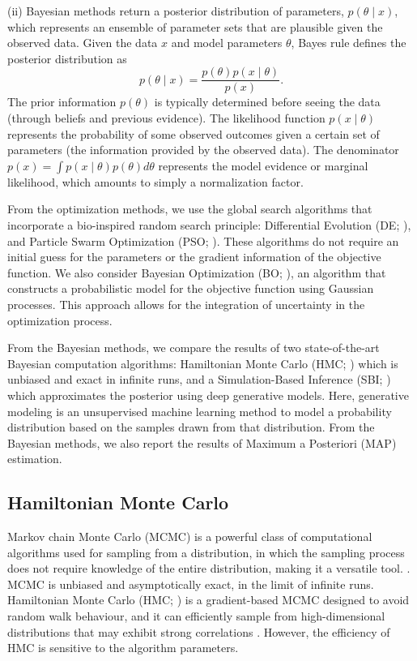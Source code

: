 \documentclass[preprint,11pt,authoryear]{elsarticle}
\begin{document}
(ii) Bayesian methods return a posterior distribution of parameters, $ p(\theta \mid x)$, which represents an ensemble of parameter sets that are plausible given the observed data. Given the data $x$ and model parameters $\theta$, Bayes rule defines the posterior distribution as
\begin{equation}
    p(\theta \mid x) = \frac{p(\theta) p(x \mid \theta)}{p(x)}. \label{eq:Bayes_rule}
\end{equation}
The prior information $p(\theta)$ is typically determined before seeing the data (through beliefs and previous evidence). The likelihood function $p(x \mid \theta)$ represents the probability of some observed outcomes given a certain set of parameters (the information provided by the observed data). The denominator $p(x)=\int p(x \mid \theta)p(\theta)d\theta$ represents the model evidence or marginal likelihood, which amounts to simply a normalization factor.


From the optimization methods, we use the global search algorithms that incorporate a bio-inspired random search principle: Differential Evolution (DE; \cite{Storn1997, Price1999}), and Particle Swarm Optimization (PSO; \cite{Kennedy1995, Eberhart1995}). These algorithms do not require an initial guess for the parameters or the gradient information of the objective function. We also consider Bayesian Optimization (BO; \cite{Snoek2012, Shahriari2015}), an algorithm that constructs a probabilistic model for the objective function using Gaussian processes. This approach allows for the integration of uncertainty in the optimization process.


From the Bayesian methods, we compare the results of two state-of-the-art Bayesian computation algorithms: Hamiltonian Monte Carlo (HMC; \cite{Duane1987, Neal2010}) which is unbiased and exact in infinite runs, and a Simulation-Based Inference (SBI; \cite{Cranmer2020, Brehmer2021}) which approximates the posterior using deep generative models. Here, generative modeling is an unsupervised machine learning method to model a probability distribution based on the samples drawn from that distribution.  From the Bayesian methods, we also report the results of Maximum a Posteriori (MAP) estimation. 



\subsection{Hamiltonian Monte Carlo}

Markov chain Monte Carlo (MCMC) is a powerful class of computational algorithms used for sampling from a distribution, in which the sampling process does not require knowledge of the entire distribution, making it a versatile tool. \citep{Andrieu2003, Murphy2022, Mcelreath2020}. MCMC is unbiased and asymptotically exact, in the limit of infinite runs. Hamiltonian Monte Carlo (HMC; \cite{Duane1987, Neal2010}) is a gradient-based MCMC designed to avoid random walk behaviour, and it can efficiently sample from high-dimensional distributions that may exhibit strong correlations \citep{Betancourt2017}. However, the efficiency of HMC is sensitive to the algorithm parameters. 
\end{document}
